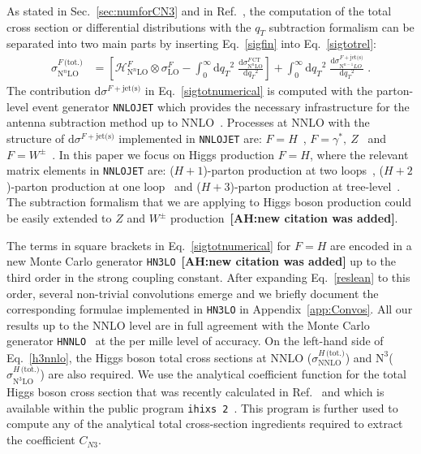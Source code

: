 \documentclass[12pt]{article}
\DeclareRobustCommand{\AH}[1]{\textbf{\quad\color{purple}[AH:\quad #1]}\xspace}
\DeclareRobustCommand{\qt}{\ensuremath{q_T}\xspace}
\DeclareRobustCommand{\rd}{\ensuremath{\mathrm{d}}}
\DeclareRobustCommand{\cH}{\ensuremath{\mathcal{H}}}
\DeclareRobustCommand{\jets}{\text{jet(s)}\xspace}
\DeclareRobustCommand{\CT}{\text{CT}\xspace}
\DeclareRobustCommand{\tot}{\text{(tot.)}\xspace}
\DeclareRobustCommand{\LO}{\text{LO}\xspace}
\DeclareRobustCommand{\NNLO}{\text{NNLO}\xspace}
\DeclareRobustCommand{\N}[1]{\ensuremath{\text{N}^{#1}}} %
\begin{document}
As stated in Sec.~\ref{sec:numforCN3} and in Ref.~\cite{Catani:2007vq}, the computation of the total cross section or differential distributions with the  $\qt$ subtraction formalism can be separated into two main parts by inserting Eq.~\eqref{sigfin} into Eq.~\eqref{sigtotrel}:
\begin{align}
  \sigma^{F\,\tot}_{\N{n}\LO}
  &=
  \left[
    \cH^F_{\N{n}\LO} \otimes \sigma^F_{\LO}
    - \int_0^\infty\rd\qt^2 \; \frac{\rd\sigma^{F\,\CT}_{\N{n}\LO}}{\rd\qt^2} 
  \right]
  + \int_0^\infty\rd\qt^2 \; \frac{\rd\sigma^{F+\jets}_{\N{n-1}LO}}{\rd\qt^2} \;.
  \label{sigtotnumerical} 
\end{align}
The contribution $\rd{\sigma}^{F+\jets}$ in Eq.~\eqref{sigtotnumerical} is computed with the parton-level event generator \texttt{NNLOJET} which provides the necessary infrastructure for the antenna subtraction method up to NNLO~\cite{Antenna:method}. 
Processes at NNLO with the structure of $\rd{\sigma}^{F+\jets}$ implemented in \texttt{NNLOJET} are: $F=H$~\cite{Chen:2016zka}, $F=\gamma^*,~Z$~\cite{Ridder:2015dxa,Gehrmann-DeRidder:2016jns} and $F=W^{\pm}$~\cite{Gehrmann-DeRidder:2017mvr}. In this paper we focus on Higgs production $F=H$, where the relevant matrix elements in 
 \texttt{NNLOJET} are: ($H+1$)-parton production at two loops~\cite{Gehrmann:2011aa}, ($H+2$)-parton production at one loop~\cite{Dixon:2009uk,Badger:2009hw,Badger:2009vh} and ($H+3$)-parton 
 production at tree-level~\cite{DelDuca:2004wt,Dixon:2004za,Badger:2004ty}. The subtraction formalism that we are applying to Higgs boson production could be easily extended  to $Z$ and $W^{\pm}$ production~\cite{leaninprep}\AH{new citation was added}.

The terms in square brackets in Eq.~\eqref{sigtotnumerical}  for $F=H$ are encoded in a new Monte Carlo generator \texttt{HN3LO}~\cite{leaninprepHN3LO}\AH{new citation was added} up to the third order in the strong coupling constant. After expanding Eq.~\eqref{reslean} to this order, several non-trivial convolutions emerge and we briefly document the corresponding formulae implemented in \texttt{HN3LO} in Appendix~\ref{app:Convos}. All our results up to the NNLO level are in full agreement with the Monte Carlo generator \texttt{HNNLO}~\cite{Catani:2007vq} at the per mille level of accuracy. On the left-hand side of Eq.~\eqref{h3nnlo}, the Higgs boson total cross sections at NNLO ($\sigma^{H\,\tot}_{\NNLO}$) and \N3\LO  ($\sigma^{H\,\tot}_{\N{3}\LO}$) are also required. 
We use the analytical coefficient function for the total Higgs boson cross section that was recently calculated in Ref.~\cite{Mistlberger:2018etf} and which is available within the public program \texttt{ihixs 2}~\cite{Dulat:2018rbf}.
This program is further used to compute any of the analytical total cross-section ingredients required to extract the coefficient $C_{N3}$.
\end{document}
